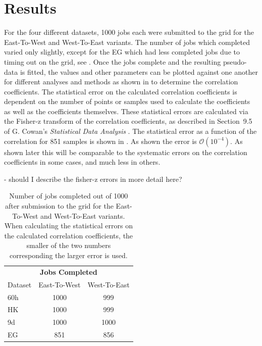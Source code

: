 
\graphicspath{{Body/Figures/Correlations/}}

\section{Results}


For the four different datasets, 1000 jobs each were submitted to the grid for the East-To-West and West-To-East variants. The number of jobs which completed varied only slightly, except for the EG which had less completed jobs due to timing out on the grid, see . Once the jobs complete and the resulting pseudo-data is fitted, the \R values and other parameters can be plotted against one another for different analyses and methods as shown in  to determine the correlation coefficients. The statistical error on the calculated correlation coefficients is dependent on the number of points or samples used to calculate the coefficients as well as the coefficients themselves. These statistical errors are calculated via the Fisher-z transform of the correlation coefficients, as described in Section~9.5 of G. Cowan's \textit{Statistical Data Analysis} \cite{Cowan}. The statistical error as a function of the correlation for 851 samples is shown in . As shown the error is $\mathcal{O}(10^{-4})$. As shown later this will be comparable to the systematic errors on the correlation coefficients in some cases, and much less in others.


- should I describe the fisher-z errors in more detail here?


\begin{table}
\centering
\renewcommand{\arraystretch}{1.2}
\begin{tabularx}{0.4\linewidth}{@{\extracolsep{\fill}}lcc}
  \hline
    \multicolumn{3}{c}{\textbf{Jobs Completed}} \\
  	Dataset & East-To-West & West-To-East \\
  \hline
  	60h & 1000 & 999 \\
  	HK & 1000 & 999 \\
  	9d & 1000 & 1000 \\
  	EG & 851 & 856 \\ 
  \hline
\end{tabularx}
\caption[]{Number of jobs completed out of 1000 after submission to the grid for the East-To-West and West-To-East variants. When calculating the statistical errors on the calculated correlation coefficients, the smaller of the two numbers corresponding the larger error is used.}
\label{tab:jobs}
\end{table}


